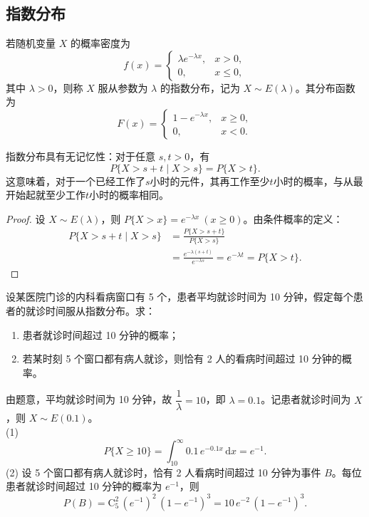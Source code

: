\documentclass[lang=cn,11pt]{elegantbook}
\begin{document}
\subsection{指数分布} \label{subsec:exp-dist}
\begin{definition}[指数分布] \label{def:exp-dist}
若随机变量 $X$ 的概率密度为
\[
f(x) = \begin{cases}
\lambda e^{-\lambda x}, & x > 0, \\
0, & x \le 0,
\end{cases}
\]
其中 $\lambda > 0$，则称 $X$ 服从参数为 $\lambda$ 的指数分布，记为 $X \sim E(\lambda)$。其分布函数为
\[
F(x) = \begin{cases}
1 - e^{-\lambda x}, & x \ge 0, \\
0, & x < 0.
\end{cases}
\]
\end{definition}

\begin{property}[无记忆性] \label{prop:memoryless}
指数分布具有无记忆性：对于任意 $s,t > 0$，有
\[
P\{X > s + t \mid X > s\} = P\{X > t\}.
\]
这意味着，对于一个已经工作了$s$小时的元件，其再工作至少$t$小时的概率，与从最开始起就至少工作$t$小时的概率相同。
\end{property}
\begin{proof}
设 \(X \sim E(\lambda)\)，则 \(P\{X > x\} = e^{-\lambda x}\ (x \geq 0)\)。由条件概率的定义：
\begin{align*}
P\{X > s + t \mid X > s\} &= \frac{P\{X > s + t\}}{P\{X > s\}} \\
&= \frac{e^{-\lambda(s+t)}}{e^{-\lambda s}} = e^{-\lambda t} = P\{X > t\}.
\end{align*}
\end{proof}


\begin{exercise}\label{exer:2-28}
设某医院门诊的内科看病窗口有 5 个，患者平均就诊时间为 10 分钟，假定每个患者的就诊时间服从指数分布。求：
\begin{enumerate}
    \item[(1)] 患者就诊时间超过 10 分钟的概率；
    \item[(2)] 若某时刻 5 个窗口都有病人就诊，则恰有 2 人的看病时间超过 10 分钟的概率。
\end{enumerate}
\end{exercise}

\begin{solution}
由题意，平均就诊时间为 10 分钟，故 $\dfrac{1}{\lambda}=10$，即 $\lambda=0.1$。记患者就诊时间为 $X$，则 $X \sim E(0.1)$。\\
(1) 
\[
P\{X \ge 10\} = \int_{10}^{\infty} 0.1\, e^{-0.1x}\,\mathrm{d}x = e^{-1}.
\]
(2) 设 5 个窗口都有病人就诊时，恰有 2 人看病时间超过 10 分钟为事件 $B$。每位患者就诊时间超过 10 分钟的概率为 $e^{-1}$，则
\[
P(B) = \mathrm{C}_5^2\, (e^{-1})^2\, (1-e^{-1})^3 = 10\, e^{-2}\,(1-e^{-1})^3.
\]
\end{solution}
\end{document}
